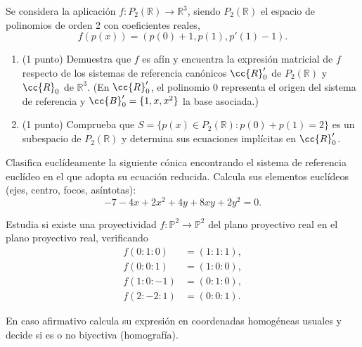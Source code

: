 \documentclass[12pt]{article}
\begin{document}
        \begin{ejercicio}[2 puntos]
        Se considera la aplicación \( f : P_2(\mathbb{R}) \to \mathbb{R}^3 \), siendo \( P_2(\mathbb{R}) \) el espacio de polinomios de orden 2 con coeficientes reales,
        \[
        f(p(x)) = (p(0) + 1, p(1), p'(1)-1).
        \]
        
        \begin{enumerate}
        \item (1 punto) Demuestra que \( f \) es afín y encuentra la expresión matricial de \( f \) respecto de los sistemas de referencia canónicos
        \( \cc{R}_0' \) de \( P_2(\mathbb{R}) \) y \( \cc{R}_0 \) de \( \mathbb{R}^3 \). (En \( \cc{R}_0' \), el polinomio $0$ representa el origen del sistema de referencia y
        \( \cc{B}_0' = \{1, x, x^2\} \) la base asociada.)
        \item (1 punto) Comprueba que \( S = \{p(x) \in P_2(\mathbb{R}) : p(0)+p(1) = 2\} \) es un subespacio de \( P_2(\mathbb{R}) \) y determina sus ecuaciones implícitas en \( \cc{R}_0' \).
        \end{enumerate}
        \end{ejercicio}
        
        \begin{ejercicio}[3 puntos] Clasifica euclídeamente la siguiente cónica encontrando el sistema de referencia euclídeo en el que adopta su ecuación reducida. Calcula sus elementos euclídeos (ejes, centro, focos, asíntotas):
        \[
        -7 - 4x + 2x^2 + 4y + 8xy + 2y^2 = 0.
        \]
        \end{ejercicio}
        
        \begin{ejercicio}[2 puntos] Estudia si existe una proyectividad \( f : \mathbb{P}^2 \to \mathbb{P}^2 \) del plano proyectivo real en el plano proyectivo real, verificando
        \begin{align*}
            f(0 : 1 : 0) &= (1 : 1 : 1), \\
            f(0 : 0 : 1) &= (1 : 0 : 0), \\
            f(1 : 0 : -1) &= (0 : 1 : 0), \\
            f(2 : -2 : 1) &= (0 : 0 : 1).
        \end{align*}
        
        En caso afirmativo calcula su expresión en coordenadas homogéneas usuales y decide si es o no biyectiva (homografía).
        \end{ejercicio}
        
     
\end{document}
